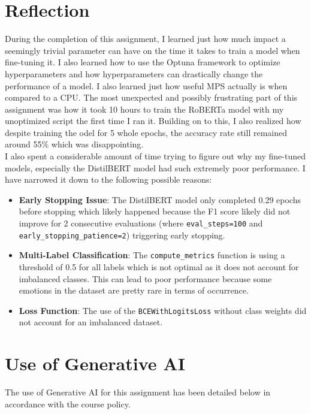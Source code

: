 \documentclass[titlepage]{article}
\begin{document}
\section{Reflection}
During the completion of this assignment, I learned just how much impact a seemingly trivial parameter can have on the time it takes to 
train a model when fine-tuning it. I also learned how to use the Optuna framework to optimize hyperparameters and how hyperparameters can drastically 
change the performance of a model. I also learned just how useful MPS actually is when compared to a CPU. The most unexpected and possibly 
frustrating part of this assignment was how it took 10 hours to train the RoBERTa model with my unoptimized script the first time I ran it. Building on to 
this, I also realized how despite training the odel for 5 whole epochs, the accuracy rate still remained around 55\% which was disappointing.\\
\newline
I also spent a considerable amount of time trying to figure out why my fine-tuned models, especially the DistilBERT model had such extremely poor performance. 
I have narrowed it down to the following possible reasons:
\begin{itemize}
    \item \textbf{Early Stopping Issue}: The DistilBERT model only completed 0.29 epochs before stopping which likely happened because the F1 score likely did 
    not improve for 2 consecutive evaluations (where \texttt{eval\_steps=100} and \texttt{early\_stopping\_patience=2}) triggering early stopping.
    \item \textbf{Multi-Label Classification}: The \texttt{compute\_metrics} function is using a threshold of 0.5 for all labels which is not optimal as it does 
    not account for imbalanced classes. This can lead to poor performance because some emotions in the dataset are pretty rare in terms of occurrence.
    \item \textbf{Loss Function}: The use of the \texttt{BCEWithLogitsLoss} without class weights did not account for an imbalanced dataset. 
\end{itemize}

\section{Use of Generative AI}
The use of Generative AI for this assignment has been detailed below in accordance with the course policy.
\end{document}
